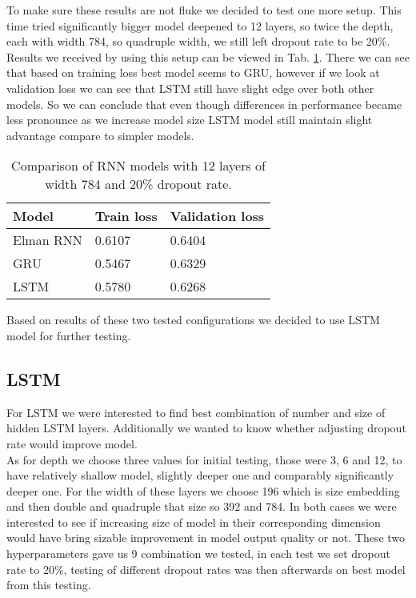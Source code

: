 To make sure these results are not fluke we decided to test one more setup. This time tried significantly bigger model deepened to 12 layers, so twice the depth, each with width 784, so quadruple width, we still left dropout rate to be 20\%. Results we received by using this setup can be viewed in Tab. \ref{tab:rnn_comp_2}. There we can see that based on training loss best model seems to GRU, however if we look at validation loss we can see that LSTM still have slight edge over both other models. So we can conclude that even though differences in performance became less pronounce as we increase model size LSTM model still maintain slight advantage compare to simpler models.
\\

\begin{table}[!h]
	\centering
	\begin{tabular}{|l|l|l|}
		\hline
		Model        & Train loss      & Validation loss \\ \hline
		Elman RNN    &  0.6107         & 0.6404          \\ \hline      
		GRU          &  0.5467         & 0.6329          \\ \hline           
		LSTM         &  0.5780         & 0.6268          \\ \hline
	\end{tabular}
	\caption{Comparison of RNN models with 12 layers of width 784 and 20\% dropout rate.}
	\label{tab:rnn_comp_2}
\end{table}

Based on results of these two tested configurations we decided to use LSTM model for further testing.

\subsection{LSTM}

For LSTM we were interested to find best combination of number and size of hidden LSTM layers. Additionally we wanted to know whether adjusting dropout rate would improve model.
\\

As for depth we choose three values for initial testing, those were 3, 6 and 12, to have relatively shallow model, slightly deeper one and comparably significantly deeper one. For the width of these layers we choose 196 which is size embedding and then double and quadruple that size so 392 and 784. In both cases we were interested to see if increasing size of model in their corresponding dimension would have bring sizable improvement in model output quality or not. These two hyperparameters gave us 9 combination we tested, in each test we set dropout rate to 20\%, testing of different dropout rates was then afterwards on best model from this testing. 
\\

